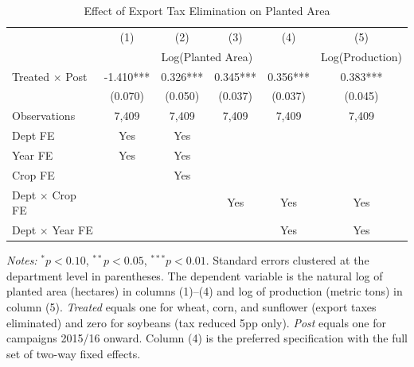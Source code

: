 \begin{table}[H]
\centering
\caption{Effect of Export Tax Elimination on Planted Area}
\label{tab:main}
\begin{threeparttable}
\begin{tabular}{lccccc}
\toprule
 & (1) & (2) & (3) & (4) & (5) \\
 & \multicolumn{4}{c}{Log(Planted Area)} & Log(Production) \\
\midrule
Treated $\times$ Post & -1.410*** & 0.326*** & 0.345*** & 0.356*** & 0.383*** \\
 & (0.070) & (0.050) & (0.037) & (0.037) & (0.045) \\
\addlinespace
Observations & 7,409 & 7,409 & 7,409 & 7,409 & 7,409 \\
Dept FE & Yes & Yes & & & \\
Year FE & Yes & Yes & & & \\
Crop FE & & Yes & & & \\
Dept $\times$ Crop FE & & & Yes & Yes & Yes \\
Dept $\times$ Year FE & & & & Yes & Yes \\
\bottomrule
\end{tabular}
\begin{tablenotes}[flushleft]
\small
\item \textit{Notes:} $^{*}p<0.10$, $^{**}p<0.05$, $^{***}p<0.01$. Standard errors clustered at the department level in parentheses. The dependent variable is the natural log of planted area (hectares) in columns (1)--(4) and log of production (metric tons) in column (5). \textit{Treated} equals one for wheat, corn, and sunflower (export taxes eliminated) and zero for soybeans (tax reduced 5pp only). \textit{Post} equals one for campaigns 2015/16 onward. Column (4) is the preferred specification with the full set of two-way fixed effects.
\end{tablenotes}
\end{threeparttable}
\end{table}

